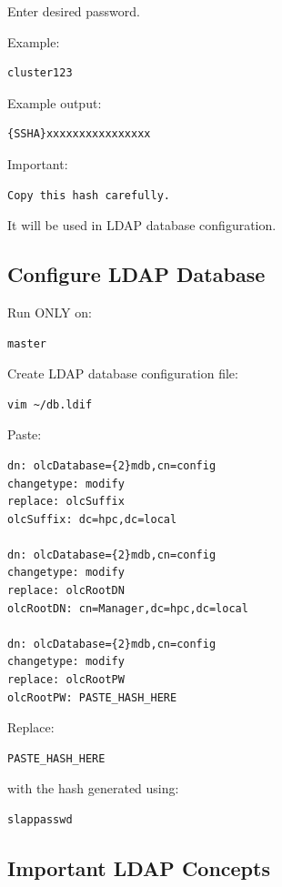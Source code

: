 \documentclass[11pt]{article}
\begin{document}
Enter desired password.

Example:

\begin{verbatim}
cluster123
\end{verbatim}

Example output:

\begin{verbatim}
{SSHA}xxxxxxxxxxxxxxxx
\end{verbatim}

Important:

\begin{verbatim}
Copy this hash carefully.
\end{verbatim}

It will be used in LDAP database configuration.
\subsection{Configure LDAP Database}
\label{sec:orge98de61}

Run ONLY on:

\begin{verbatim}
master
\end{verbatim}

Create LDAP database configuration file:

\begin{verbatim}
vim ~/db.ldif
\end{verbatim}

Paste:

\begin{verbatim}
dn: olcDatabase={2}mdb,cn=config
changetype: modify
replace: olcSuffix
olcSuffix: dc=hpc,dc=local

dn: olcDatabase={2}mdb,cn=config
changetype: modify
replace: olcRootDN
olcRootDN: cn=Manager,dc=hpc,dc=local

dn: olcDatabase={2}mdb,cn=config
changetype: modify
replace: olcRootPW
olcRootPW: PASTE_HASH_HERE
\end{verbatim}

Replace:

\begin{verbatim}
PASTE_HASH_HERE
\end{verbatim}

with the hash generated using:

\begin{verbatim}
slappasswd
\end{verbatim}
\subsection{Important LDAP Concepts}
\label{sec:orgdc90fc8}
\end{document}
